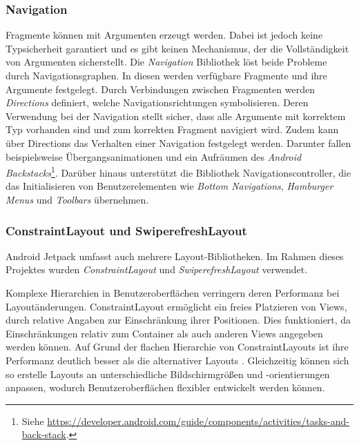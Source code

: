 \subsubsection{Navigation}
\label{subsubsec:app:jetpack:navigation}
Fragmente können mit Argumenten erzeugt werden.
Dabei ist jedoch keine Typsicherheit garantiert und es gibt keinen Mechanismus, der die Vollständigkeit von Argumenten sicherstellt.
Die \textit{Navigation} Bibliothek löst beide Probleme durch Navigationsgraphen.
In diesen werden verfügbare Fragmente und ihre Argumente festgelegt.
Durch Verbindungen zwischen Fragmenten werden \textit{Directions} definiert, welche Navigationsrichtungen symbolisieren.
Deren Verwendung bei der Navigation stellt sicher, dass alle Argumente mit korrektem Typ vorhanden sind und zum korrekten Fragment navigiert wird.
Zudem kann über Directions das Verhalten einer Navigation festgelegt werden.
Darunter fallen beispielsweise Übergangsanimationen und ein Aufräumen des \textit{Android Backstacks}\footnote{Siehe \url{https://developer.android.com/guide/components/activities/tasks-and-back-stack}.}.
Darüber hinaus unterstützt die Bibliothek Navigationscontroller, die das Initialisieren von Benutzerelementen wie \textit{Bottom Navigations}, \textit{Hamburger Menus} und \textit{Toolbars} übernehmen.


\subsubsection{ConstraintLayout und SwiperefreshLayout}
\label{subsubsec:app:jetpack:layouts}
Android Jetpack umfasst auch mehrere Layout-Bibliotheken.
Im Rahmen dieses Projektes wurden \textit{ConstraintLayout} und \textit{SwiperefreshLayout} verwendet.

Komplexe Hierarchien in Benutzeroberflächen verringern deren Performanz bei Layoutänderungen.
ConstraintLayout ermöglicht ein freies Platzieren von Views, durch relative Angaben zur Einschränkung ihrer Positionen.
Dies funktioniert, da Einschränkungen relativ zum Container als auch anderen Views angegeben werden können.
Auf Grund der flachen Hierarchie von ConstraintLayouts ist ihre Performanz deutlich besser als die alternativer Layouts \autocite{viewperformance}.
Gleichzeitig können sich so erstelle Layouts an unterschiedliche Bildschirmgrößen und -orientierungen anpassen, wodurch Benutzeroberflächen flexibler entwickelt werden können.

